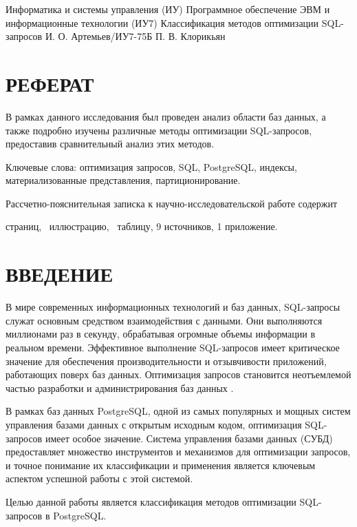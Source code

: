 \documentclass{bmstu}
\begin{document}
\makeresearchtitle
{Информатика и системы управления (ИУ)}
{Программное обеспечение ЭВМ и информационные технологии (ИУ7)}
{Классификация методов оптимизации SQL-запросов}
{И. О. Артемьев/ИУ7-75Б}
{П. В. Клорикьян}
{}
{}
{}

\setcounter{page}{3}
\chapter*{РЕФЕРАТ}

В рамках данного исследования был проведен анализ области баз данных, а также подробно изучены различные методы оптимизации SQL-запросов, предоставив сравнительный анализ этих методов.

Ключевые слова: оптимизация запросов, SQL, PostgreSQL, индексы, материализованные представления, партиционирование.

Рассчетно-пояснительная записка к научно-исследовательской работе содержит \begin{NoHyper}\pageref{LastPage}\end{NoHyper} страниц, \totfig~иллюстрацию, \tottab~таблицу, 9 источников, 1 приложение.

\clearpage

\maketableofcontents


\chapter*{ВВЕДЕНИЕ}

В мире современных информационных технологий и баз данных, SQL-запросы служат основным средством взаимодействия с данными. Они выполняются миллионами раз в секунду, обрабатывая огромные объемы информации в реальном времени. Эффективное выполнение SQL-запросов имеет критическое значение для обеспечения производительности и отзывчивости приложений, работающих поверх баз данных. Оптимизация запросов становится неотъемлемой частью разработки и администрирования баз данных \cite{firstOptSQL}.

В рамках баз данных PostgreSQL, одной из самых популярных и мощных систем управления базами данных с открытым исходным кодом, оптимизация SQL-запросов имеет особое значение. Система управления базами данных (СУБД) предоставляет множество инструментов и механизмов для оптимизации запросов, и точное понимание их классификации и применения является ключевым аспектом успешной работы с этой системой.

Целью данной работы является классификация методов оптимизации SQL-запросов в PostgreSQL.
\end{document}
